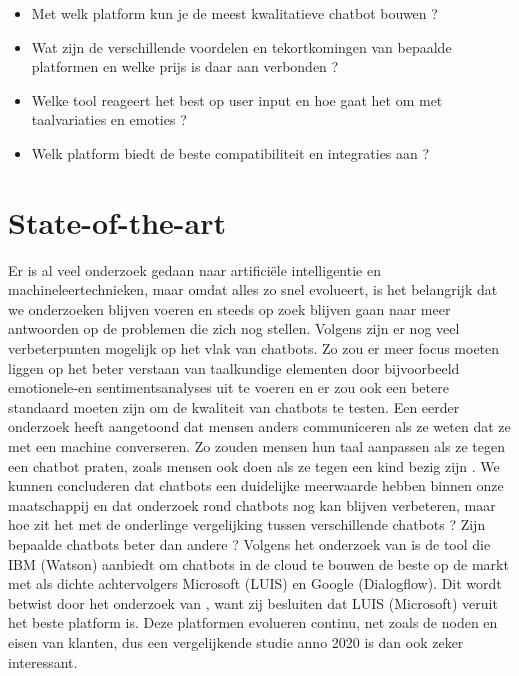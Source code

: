 \begin{itemize}
  \item Met welk platform kun je de meest kwalitatieve chatbot bouwen ?
  \item Wat zijn de verschillende voordelen en tekortkomingen van bepaalde platformen en welke prijs is daar aan verbonden ?
  \item Welke tool reageert het best op user input en hoe gaat het om met taalvariaties en emoties ?
  \item Welk platform biedt de beste compatibiliteit en integraties aan ?
\end{itemize}


\section{State-of-the-art}
\label{sec:state-of-the-art}
Er is al veel onderzoek gedaan naar artificiële intelligentie en machineleertechnieken, maar omdat alles zo snel evolueert, is het belangrijk dat we onderzoeken blijven voeren en steeds op zoek blijven  gaan naar meer antwoorden op de problemen die zich nog stellen. Volgens  \textcite{Hussain2019} zijn er nog veel verbeterpunten mogelijk op het vlak van chatbots. Zo zou er meer focus moeten liggen op het beter verstaan van taalkundige elementen door bijvoorbeeld emotionele-en sentimentsanalyses uit te voeren en er zou ook een betere standaard moeten zijn om de kwaliteit van chatbots te testen. Een eerder onderzoek heeft aangetoond dat mensen anders communiceren als ze weten dat ze met een machine converseren. Zo zouden mensen hun taal aanpassen als ze tegen een chatbot praten, zoals mensen ook doen als ze tegen een kind bezig zijn \autocite{Hill2015}.
We kunnen concluderen dat chatbots een duidelijke meerwaarde hebben binnen onze maatschappij en dat onderzoek rond chatbots nog kan blijven verbeteren, maar hoe zit het met de onderlinge vergelijking tussen verschillende chatbots ? Zijn bepaalde chatbots beter dan andere ? Volgens het onderzoek van \textcite{Russis2018} is de tool die IBM (Watson) aanbiedt om chatbots in de cloud te bouwen de beste op de markt met als dichte achtervolgers Microsoft (LUIS) en Google (Dialogflow). Dit wordt betwist door het onderzoek van \textcite{Langen2017}, want zij besluiten dat LUIS (Microsoft) veruit het beste platform is. Deze platformen evolueren continu, net zoals de noden en eisen van klanten, dus een vergelijkende studie anno 2020 is dan ook zeker interessant. 


